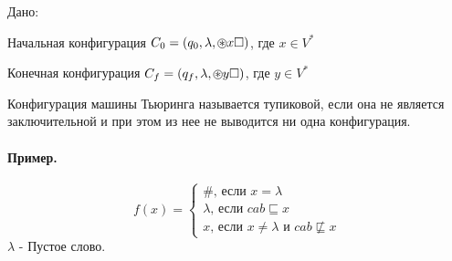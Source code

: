 

\title{}
\author{Козырнов Александр Дмитриевич, ИУ7-32Б}
\date{\today}



Дано:

Начальная конфигурация $C_0=(q_0,\lambda, \ozv x\square)$, где $x \in V^{*}$

Конечная конфигурация $C_{f} = (q_{f}, \lambda, \ozv y\square)$, где $y \in V^{*}$



\begin{definition}
Конфигурация машины Тьюринга называется тупиковой, если она не является заключительной и при этом из
нее не выводится ни одна конфигурация.
\end{definition}

\paragraph*{Пример.}
\[
f(x) = \begin{cases}
    \#\text{, если } x = \lambda \\
    \lambda\text{, если } cab \sqsubseteq x\\
    x\text{, если } x\neq \lambda\text{ и } cab \not\sqsubseteq x
\end{cases}
\]
$\lambda$ - Пустое слово.

